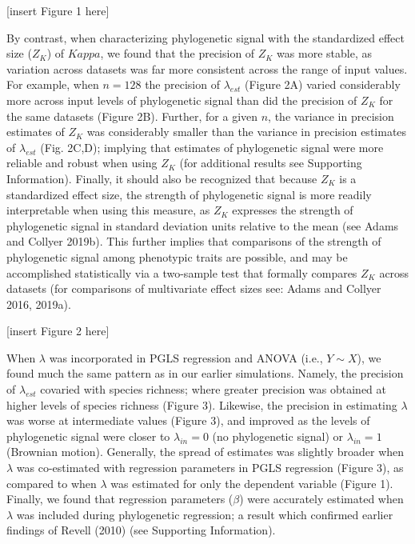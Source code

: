 \documentclass[
]{article}
\begin{document}
{[}insert Figure 1 here{]} \hfill\break

By contrast, when characterizing phylogenetic signal with the
standardized effect size (\(Z_K\)) of \(Kappa\), we found that the
precision of \(Z_K\) was more stable, as variation across datasets was
far more consistent across the range of input values. For example, when
\(n=128\) the precision of \(\lambda_{est}\) (Figure 2A) varied
considerably more across input levels of phylogenetic signal than did
the precision of \(Z_K\) for the same datasets (Figure 2B). Further, for
a given \(n\), the variance in precision estimates of \(Z_K\) was
considerably smaller than the variance in precision estimates of
\(\lambda_{est}\) (Fig. 2C,D); implying that estimates of phylogenetic
signal were more reliable and robust when using \(Z_K\) (for additional
results see Supporting Information). Finally, it should also be
recognized that because \(Z_K\) is a standardized effect size, the
strength of phylogenetic signal is more readily interpretable when using
this measure, as \(Z_K\) expresses the strength of phylogenetic signal
in standard deviation units relative to the mean (see Adams and Collyer
2019b). This further implies that comparisons of the strength of
phylogenetic signal among phenotypic traits are possible, and may be
accomplished statistically via a two-sample test that formally compares
\(Z_K\) across datasets (for comparisons of multivariate effect sizes
see: Adams and Collyer 2016, 2019a). \hfill\break

{[}insert Figure 2 here{]} \hfill\break 

When \(\lambda\) was incorporated in PGLS regression and ANOVA (i.e.,
\(Y\sim{X}\)), we found much the same pattern as in our earlier
simulations. Namely, the precision of \(\lambda_{est}\) covaried with
species richness; where greater precision was obtained at higher levels
of species richness (Figure 3). Likewise, the precision in estimating
\(\lambda\) was worse at intermediate values (Figure 3), and improved as
the levels of phylogenetic signal were closer to \(\lambda_{in}=0\) (no
phylogenetic signal) or \(\lambda_{in}=1\) (Brownian motion). Generally,
the spread of estimates was slightly broader when \(\lambda\) was
co-estimated with regression parameters in PGLS regression (Figure 3),
as compared to when \(\lambda\) was estimated for only the dependent
variable (Figure 1). Finally, we found that regression parameters
(\(\beta\)) were accurately estimated when \(\lambda\) was included
during phylogenetic regression; a result which confirmed earlier
findings of Revell (2010) (see Supporting Information). \hfill\break
\end{document}

